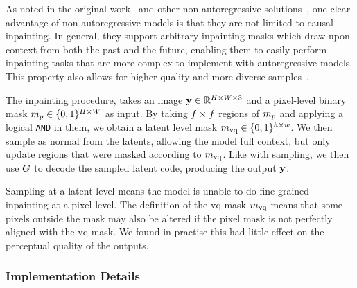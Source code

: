 As noted in the original work~\cite{savinov2022stepunrolled} and other
non-autoregressive solutions~\cite{bondtaylor2021unleashing}, one clear
advantage of non-autoregressive models is that they are not limited to causal
inpainting. In general, they support arbitrary inpainting masks which draw upon
context from both the past and the future, enabling them to easily perform
inpainting tasks that are more complex to implement with autoregressive models.
This property also allows for higher quality and more diverse
samples~\cite{bondtaylor2021unleashing}.

The inpainting procedure, takes an image $\mathbf{y} \in \mathbb{R}^{H \times
W \times 3}$ and a pixel-level binary mask $m_p \in \{0, 1\}^{H \times
W}$ as input. By taking $f \times f$ regions of
$m_p$ and applying a logical \texttt{AND} in them, we obtain a latent
level mask $m_\textrm{vq} \in \{0,1\}^{h \times w}$. We then sample as normal from the
latents, allowing the model full context, but only update regions that were
masked according to $m_\textrm{vq}$. Like with sampling, we then use $G$
to decode the sampled latent code, producing the output $\mathbf{y}$.

Sampling at a latent-level means the model is unable to do fine-grained
inpainting at a pixel level. The definition of the \gls{vq} mask $m_\textrm{vq}$ means
that some pixels outside the mask may also be altered if the pixel mask is not
perfectly aligned with the \gls{vq} mask. We found in practise this had little
effect on the perceptual quality of the outputs.

\subsubsection*{Implementation Details}

